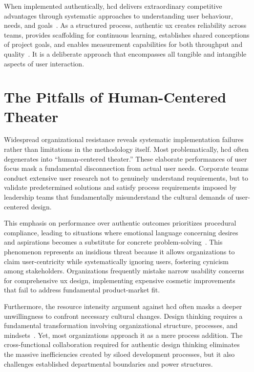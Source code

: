 \documentclass[11pt,showkeys]{../../shared/essay}
\begin{document}
When implemented authentically, \gls{hcd} delivers extraordinary competitive advantages through systematic approaches to understanding user behaviour, needs, and goals~\cite{illingworth2025wk1}. As a structured process, authentic \gls{ux} creates reliability across teams, provides scaffolding for continuous learning, establishes shared conceptions of project goals, and enables measurement capabilities for both throughput and quality~\cite{illingworth2025wk2}. It is a deliberate approach that encompasses all tangible and intangible aspects of user interaction.

\section{The Pitfalls of Human-Centered Theater}

Widespread organizational resistance reveals systematic implementation failures rather than limitations in the methodology itself. Most problematically, \gls{hcd} often degenerates into ``human-centered theater.'' These elaborate performances of user focus mask a fundamental disconnection from actual user needs. Corporate teams conduct extensive user research not to genuinely understand requirements, but to validate predetermined solutions and satisfy process requirements imposed by leadership teams that fundamentally misunderstand the cultural demands of user-centered design.

This emphasis on performance over authentic outcomes prioritizes procedural compliance, leading to situations where emotional language concerning desires and aspirations becomes a substitute for concrete problem-solving~\cite{kolko2015}. This phenomenon represents an insidious threat because it allows organizations to claim user-centricity while systematically ignoring users, fostering cynicism among stakeholders. Organizations frequently mistake narrow usability concerns for comprehensive \gls{ux} design, implementing expensive cosmetic improvements that fail to address fundamental product-market fit. 

Furthermore, the resource intensity argument against \gls{hcd} often masks a deeper unwillingness to confront necessary cultural changes. Design thinking requires a fundamental transformation involving organizational structure, processes, and mindsets~\cite{elsbach2018}. Yet, most organizations approach it as a mere process addition. The cross-functional collaboration required for authentic design thinking eliminates the massive inefficiencies created by siloed development processes, but it also challenges established departmental boundaries and power structures.
\end{document}
